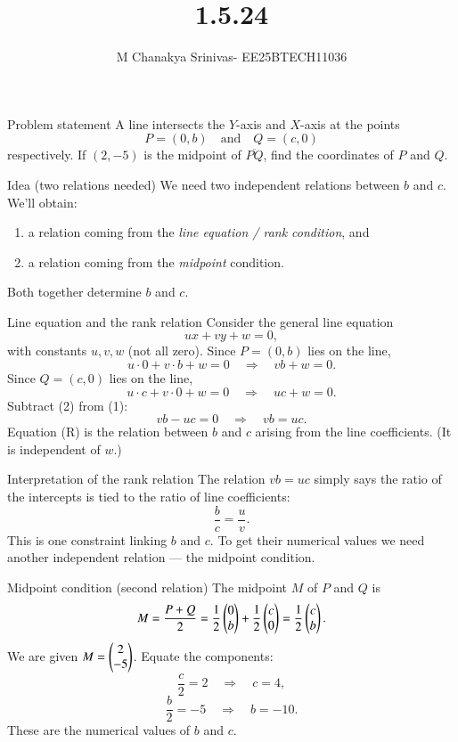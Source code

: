 \documentclass{beamer}
\title %
{1.5.24}
\date{}
\author %
{M Chanakya Srinivas- EE25BTECH11036}
\begin{document}
\begin{frame}
  \titlepage
\end{frame}

\begin{frame}{Problem statement}
A line intersects the \(Y\)-axis and \(X\)-axis at the points
\[
P=(0,b)\quad\text{and}\quad Q=(c,0)
\]
respectively. If \((2,-5)\) is the midpoint of \(\overline{PQ}\), find the coordinates of \(P\) and \(Q\).
\end{frame}

\begin{frame}{Idea (two relations needed)}
We need two independent relations between \(b\) and \(c\). We'll obtain:
\begin{enumerate}
  \item a relation coming from the \emph{line equation / rank condition}, and
  \item a relation coming from the \emph{midpoint} condition.
\end{enumerate}
Both together determine \(b\) and \(c\).
\end{frame}

\begin{frame}{Line equation and the rank relation}
Consider the general line equation
\[
u x + v y + w = 0,
\]
with constants \(u,v,w\) (not all zero). Since \(P=(0,b)\) lies on the line,
\[
u\cdot 0 + v\cdot b + w = 0 \quad\Rightarrow\quad v b + w = 0. \tag{1}
\]
Since \(Q=(c,0)\) lies on the line,
\[
u\cdot c + v\cdot 0 + w = 0 \quad\Rightarrow\quad u c + w = 0. \tag{2}
\]
Subtract (2) from (1):
\[
v b - u c = 0 \quad\Rightarrow\quad v b = u c. \tag{R}
\]
Equation (R) is the relation between \(b\) and \(c\) arising from the line coefficients.
(It is independent of \(w\).)
\end{frame}

\begin{frame}{Interpretation of the rank relation}
The relation \(v b = u c\) simply says the ratio of the intercepts is tied to the ratio of line coefficients:
\[
\frac{b}{c} = \frac{u}{v}.
\]
This is one constraint linking \(b\) and \(c\). To get their numerical values we need another independent relation — the midpoint condition.
\end{frame}

\begin{frame}{Midpoint condition (second relation)}
The midpoint \(M\) of \(P\) and \(Q\) is
\[
M = \frac{P + Q}{2} = \frac{1}{2}\begin{pmatrix}0\\b\end{pmatrix} + \frac{1}{2}\begin{pmatrix}c\\0\end{pmatrix} = \frac{1}{2}\begin{pmatrix}c\\b\end{pmatrix}.
\]
We are given \(M=\begin{pmatrix}2\\-5\end{pmatrix}\). Equate the components:
\[
\frac{c}{2} = 2 \quad\Rightarrow\quad c = 4,
\]
\[
\frac{b}{2} = -5 \quad\Rightarrow\quad b = -10.
\]
These are the numerical values of \(b\) and \(c\).
\end{frame}
\end{document}
